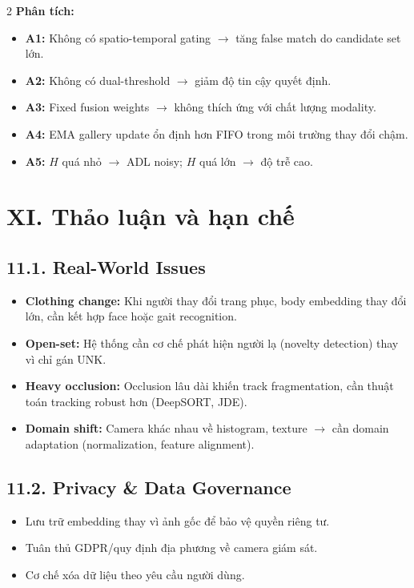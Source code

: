 \documentclass[a4paper,13pt]{article}
\begin{document}
\begin{multicols}{2}
\textbf{Phân tích:}
\begin{itemize}
    \item \textbf{A1:} Không có spatio-temporal gating $\to$ tăng false match do candidate set lớn.
    \item \textbf{A2:} Không có dual-threshold $\to$ giảm độ tin cậy quyết định.
    \item \textbf{A3:} Fixed fusion weights $\to$ không thích ứng với chất lượng modality.
    \item \textbf{A4:} EMA gallery update ổn định hơn FIFO trong môi trường thay đổi chậm.
    \item \textbf{A5:} $H$ quá nhỏ $\to$ ADL noisy; $H$ quá lớn $\to$ độ trễ cao.
\end{itemize}

\section*{XI. Thảo luận và hạn chế}

\subsection*{11.1. Real-World Issues}
\begin{itemize}
    \item \textbf{Clothing change:} Khi người thay đổi trang phục, body embedding thay đổi lớn, cần kết hợp face hoặc gait recognition.
    \item \textbf{Open-set:} Hệ thống cần cơ chế phát hiện người lạ (novelty detection) thay vì chỉ gán UNK.
    \item \textbf{Heavy occlusion:} Occlusion lâu dài khiến track fragmentation, cần thuật toán tracking robust hơn (DeepSORT, JDE).
    \item \textbf{Domain shift:} Camera khác nhau về histogram, texture $\to$ cần domain adaptation (normalization, feature alignment).
\end{itemize}

\subsection*{11.2. Privacy \& Data Governance}
\begin{itemize}
    \item Lưu trữ embedding thay vì ảnh gốc để bảo vệ quyền riêng tư.
    \item Tuân thủ GDPR/quy định địa phương về camera giám sát.
    \item Cơ chế xóa dữ liệu theo yêu cầu người dùng.
\end{itemize}


\end{multicols}
\end{document}
